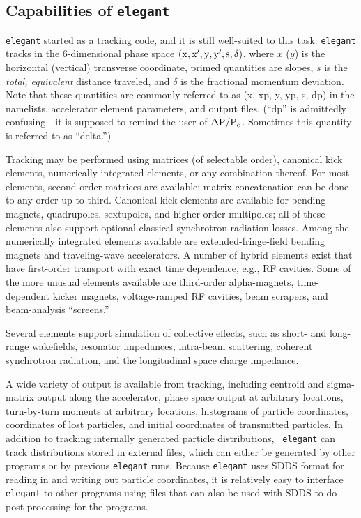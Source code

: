 \documentclass[11pt]{article}
\begin{document}
\subsection{Capabilities of {\tt elegant}}

{\tt elegant} started as a tracking code, and it is still well-suited
to this task.  {\tt elegant} tracks in the 6-dimensional phase space
${\rm (x, x^\prime, y, y^\prime, s, \delta)}$, where $x$ ($y$) is the
horizontal (vertical) transverse coordinate, primed quantities are
slopes, $s$ is the {\em total, equivalent} distance traveled, and $\delta$ is the
fractional momentum deviation\cite{KLBrown}.  Note that these
quantities are commonly referred to as (x, xp, y, yp, s, dp) in the
namelists, accelerator element parameters, and output files.  (``dp''
is admittedly confusing---it is supposed to remind the user of ${\rm
\Delta P/P_o}$.  Sometimes this quantity is referred to as ``delta.'')

Tracking may be performed using matrices (of selectable order),
canonical kick elements, numerically integrated elements, or any
combination thereof.  For most elements, second-order matrices are
available; matrix concatenation can be done to any order up to third.
Canonical kick elements are available for bending magnets,
quadrupoles, sextupoles, and higher-order multipoles; all of these
elements also support optional classical synchrotron radiation losses.
Among the numerically integrated elements available are
extended-fringe-field bending magnets and traveling-wave accelerators.
A number of hybrid elements exist that have first-order transport with
exact time dependence, e.g., RF cavities.    Some of the more unusual
elements available are third-order
alpha-magnets\cite{Enge,Borland_thesis}, time-dependent kicker
magnets, voltage-ramped RF cavities, beam scrapers, and beam-analysis
``screens.''

Several elements support simulation of collective effects, such as
short- and long-range wakefields, resonator impedances, intra-beam scattering,
coherent synchrotron radiation, and the longitudinal space charge
impedance. 

A wide variety of output is available from tracking, including
centroid and sigma-matrix output along the accelerator, phase space
output at arbitrary locations, turn-by-turn moments at arbitrary
locations, histograms of particle coordinates, coordinates of lost
particles, and initial coordinates of transmitted particles.  In
addition to tracking internally generated particle distributions, {\tt
elegant} can track distributions stored in external files, which can
either be generated by other programs or by previous {\tt elegant}
runs.  Because {\tt elegant} uses SDDS format for reading in and
writing out particle coordinates, it is relatively easy to interface
{\tt elegant} to other programs using files that can also be used with
SDDS to do post-processing for the programs.
\end{document}
